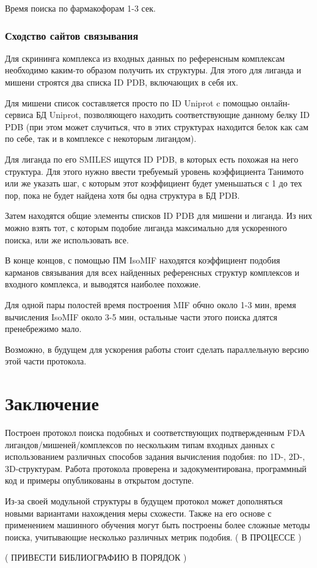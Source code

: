 \documentclass[a4paper,14pt]{article}         %
\begin{document}
Время поиска по фармакофорам 1-3 сек.
\subsubsection{Сходство сайтов связывания}
Для скрининга комплекса из входных данных по референсным комплексам необходимо каким-то образом получить их структуры. Для этого для лиганда и мишени строятся два списка ID PDB, включающих в себя их. 

Для мишени список составляется просто по ID Uniprot c помощью онлайн-сервиса БД Uniprot, позволяющего находить соответствующие данному белку ID PDB (при этом может случиться, что в этих структурах находится белок как сам по себе, так и в комплексе с некоторым лигандом). 

Для лиганда по его SMILES ищутся ID PDB, в которых есть похожая на него структура. Для этого нужно ввести требуемый уровень коэффициента Танимото или же указать шаг, с которым этот коэффициент будет уменьшаться с 1 до тех пор, пока не будет найдена хотя бы одна структура в БД PDB.

Затем находятся общие элементы списков ID PDB для мишени и лиганда. Из них можно взять тот, с которым подобие лиганда максимально для ускоренного поиска, или же использовать все.

В конце концов, с помощью ПМ IsoMIF находятся коэффициент подобия карманов связывания для всех найденных референсных структур комплексов и входного комплекса, и выводятся наиболее похожие.

Для одной пары полостей время построения MIF обчно около 1-3 мин, время вычисления IsoMIF около 3-5 мин, остальные части этого поиска длятся пренебрежимо мало.

Возможно, в будущем для ускорения работы стоит сделать параллельную версию этой части протокола.

\newpage
\section{Заключение}
Построен протокол поиска подобных и соответствующих подтвержденным FDA лигандов/мишеней/комплексов по нескольким типам входных данных с использованием различных способов задания вычисления подобия: по 1D-, 2D-, 3D-структурам. Работа протокола проверена и задокументирована, программный код и примеры опубликованы в открытом доступе. 

Из-за своей модульной структуры в будущем протокол может дополняться новыми вариантами нахождения меры схожести. Также на его основе с применением машинного обучения могут быть построены более сложные методы поиска, учитывающие несколько различных метрик подобия.
(\color{orange} В ПРОЦЕССЕ \color{black})

(\color{orange} ПРИВЕСТИ БИБЛИОГРАФИЮ В ПОРЯДОК \color{black})
\newpage
\printbibliography
\end{document}
